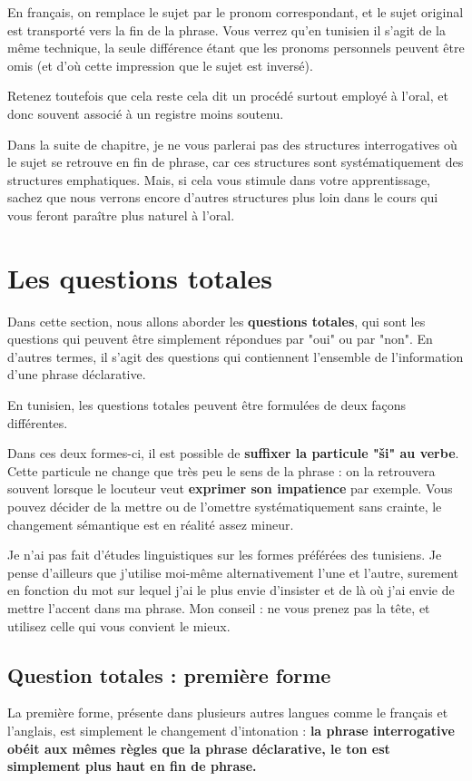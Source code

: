 En français, on remplace le sujet par le pronom correspondant, et le sujet original est transporté vers la fin de la phrase. Vous verrez qu'en tunisien il s'agit de la même technique, la seule différence étant que les pronoms personnels peuvent être omis (et d'où cette impression que le sujet est inversé).

Retenez toutefois que cela reste cela dit un procédé surtout employé à l'oral, et donc souvent associé à un registre moins soutenu.

Dans la suite de chapitre, je ne vous parlerai pas des structures interrogatives où le sujet se retrouve en fin de phrase, car ces structures sont systématiquement des structures emphatiques. Mais, si cela vous stimule dans votre apprentissage, sachez que nous verrons encore d'autres structures plus loin dans le cours qui vous feront paraître plus naturel à l'oral.

\section{Les questions totales}
Dans cette section, nous allons aborder les \textbf{questions totales}, qui sont les questions qui peuvent être simplement répondues par "oui" ou par "non". En d'autres termes, il s'agit des questions qui contiennent l'ensemble de  l'information d'une phrase déclarative.

En tunisien, les questions totales peuvent être formulées de deux façons différentes.

Dans ces deux formes-ci, il est possible de \textbf{suffixer la particule "\v{s}i" au verbe}. Cette particule ne change que très peu le sens de la phrase : on la retrouvera souvent lorsque le locuteur veut \textbf{exprimer son impatience} par exemple. Vous pouvez décider de la mettre ou de l'omettre systématiquement sans crainte, le changement sémantique est en réalité assez mineur.

Je n'ai pas fait d'études linguistiques sur les formes préférées des tunisiens. Je pense d'ailleurs que j'utilise moi-même alternativement l'une et l'autre, surement en fonction du mot sur lequel j'ai le plus envie d'insister et de là où j'ai envie de mettre l'accent dans ma phrase. Mon conseil : ne vous prenez pas la tête, et utilisez celle qui vous convient le mieux.

\subsection{Question totales : première forme}
La première forme, présente dans plusieurs autres langues comme le français et l'anglais, est simplement le changement d'intonation : \textbf{la phrase interrogative obéit aux mêmes règles que la phrase déclarative, le ton est simplement plus haut en fin de phrase.}

